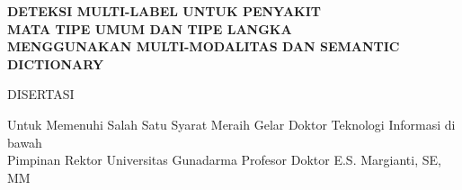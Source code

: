 \newpage
{}

\begin{center}

\begin{figure}[h]
\end{figure}

\vspace{1.0cm}


 {\fontsize{16.5}{48} \selectfont \textbf{DETEKSI MULTI-LABEL UNTUK PENYAKIT}}\\
 {\fontsize{16.5}{48} \selectfont \textbf{MATA TIPE UMUM DAN TIPE LANGKA}}\\
  {\fontsize{16.5}{48} \selectfont \textbf{MENGGUNAKAN MULTI-MODALITAS DAN SEMANTIC DICTIONARY}}
  
\vspace{1.5cm}

{\large DISERTASI}

\vspace{0.5cm}

\begin{small}Untuk Memenuhi Salah Satu Syarat Meraih Gelar Doktor Teknologi Informasi di bawah\\
 Pimpinan Rektor Universitas Gunadarma Profesor Doktor E.S. Margianti, SE, MM\\\end{small}


\end{center}
